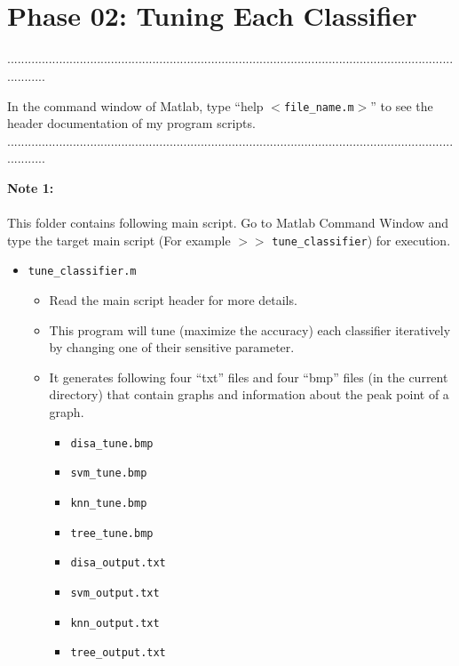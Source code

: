 \documentclass[a4paper,12pt]{article} %
\begin{document}
\pagestyle{fancy}
 \renewcommand{\headrulewidth}{1pt}
\sectionfont{\fontsize{12}{15}\selectfont}
\vspace{2cm}


\section*{\\Phase 02: Tuning Each Classifier}
............................................................................................................................................

In the command window of Matlab, type ``help $<$\verb|file_name.m|$>$'' to see the header documentation of my program scripts.\\
............................................................................................................................................

\textbf{Note 1:}\\\\
This folder contains following main script. Go to Matlab Command Window and type the target main script (For example $>>$  \verb|tune_classifier|) for execution.
\begin{itemize}
	\item \verb|tune_classifier.m|   
		\begin{itemize}
		\item Read the main script header for more details.
		\item This program will tune (maximize the accuracy) each classifier iteratively by changing one of their sensitive parameter.
		
		\item It generates following four ``txt'' files and four ``bmp'' files (in the current directory) that contain graphs and information about the peak point of a graph.	
				\begin{itemize}
					\item \verb|disa_tune.bmp|
					\item \verb|svm_tune.bmp|
					\item \verb|knn_tune.bmp|
					\item \verb|tree_tune.bmp|
					\item \verb|disa_output.txt|
					\item \verb|svm_output.txt|
					\item \verb|knn_output.txt|
					\item \verb|tree_output.txt|	\\\\			
				\end{itemize}
		\end{itemize}
\end{itemize}
\end{document}
